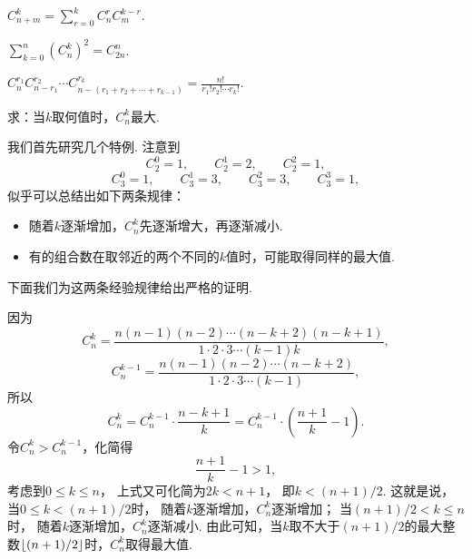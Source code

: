 \begin{property}\label{theorem:组合数性质7}
\(C_{n+m}^k = \sum_{r=0}^{k} C_n^r C_m^{k-r}\).
\end{property}

\begin{property}\label{theorem:组合数性质8}
\(\sum_{k=0}^n (C_n^k)^2 = C_{2n}^n\).
\end{property}

\begin{property}\label{theorem:组合数性质9}
\(C_n^{r_1} C_{n-r_1}^{r_2} \dotsm C_{n-(r_1+r_2+\dotsb+r_{k-1})}^{r_k}
= \frac{n!}{r_1! r_2! \dotsm r_k!}\).
\end{property}

\begin{example}
求：当\(k\)取何值时，\(C_n^k\)最大.
\begin{solution}
我们首先研究几个特例.
注意到\begin{equation*}
	C_2^0 = 1, \qquad
	C_2^1 = 2, \qquad
	C_2^2 = 1,
\end{equation*}\begin{equation*}
	C_3^0 = 1, \qquad
	C_3^1 = 3, \qquad
	C_3^2 = 3, \qquad
	C_3^3 = 1,
\end{equation*}
似乎可以总结出如下两条规律：
\begin{itemize}
	\item 随着\(k\)逐渐增加，\(C_n^k\)先逐渐增大，再逐渐减小.
	\item 有的组合数在取邻近的两个不同的\(k\)值时，可能取得同样的最大值.
\end{itemize}
下面我们为这两条经验规律给出严格的证明.

因为\begin{equation*}
	C_n^k = \frac{n(n-1)(n-2)\dotsm(n-k+2)(n-k+1)}{1\cdot2\cdot3\dotsm(k-1)k},
\end{equation*}\begin{equation*}
	C_n^{k-1} = \frac{n(n-1)(n-2)\dotsm(n-k+2)}{1\cdot2\cdot3\dotsm(k-1)},
\end{equation*}
所以\begin{equation*}
	C_n^k = C_n^{k-1} \cdot \frac{n-k+1}{k}
	= C_n^{k-1} \cdot \left( \frac{n+1}{k} - 1 \right).
\end{equation*}
令\(C_n^k > C_n^{k-1}\)，化简得\begin{equation*}
	\frac{n+1}{k} - 1 > 1,
\end{equation*}
考虑到\(0 \leq k \leq n\)，
上式又可化简为\(2k < n+1\)，
即\(k < (n+1)/2\).
这就是说，当\(0 \leq k < (n+1)/2\)时，
随着\(k\)逐渐增加，\(C_n^k\)逐渐增加；
当\((n+1)/2 < k \leq n\)时，
随着\(k\)逐渐增加，\(C_n^k\)逐渐减小.
由此可知，当\(k\)取不大于\((n+1)/2\)的最大整数\(\lfloor(n+1)/2\rfloor\)时，\(C_n^k\)取得最大值.


\end{solution}
\end{example}
